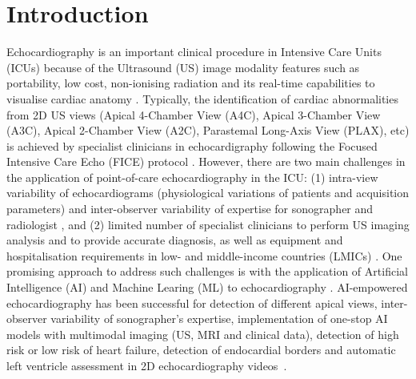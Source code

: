 \documentclass[mlabstract,twocolumn]{jmlr}
\begin{document}
\section{Introduction}
\label{sec:intro}
Echocardiography is an important clinical procedure in Intensive Care Units (ICUs) because of the Ultrasound (US) image modality features such as portability, low cost, non-ionising radiation and its real-time capabilities to visualise cardiac anatomy \citep{Feigenbaum1996, Vieillard-Baron2008, singh2007, cambell2018}.
Typically, the identification of cardiac abnormalities from 2D US views (Apical 4-Chamber View (A4C), Apical 3-Chamber View (A3C), Apical 2-Chamber View (A2C), Parastemal Long-Axis View (PLAX), etc) is achieved by specialist clinicians in echocardigraphy following the Focused Intensive Care Echo (FICE) protocol \citep{2017_hall_JIntensiveCareSociety}. %
However, there are two main challenges in the application of point-of-care echocardiography in the ICU:
(1) intra-view variability of echocardiograms (physiological variations of patients and acquisition parameters) and inter-observer variability of expertise for sonographer and radiologist \citep{khamis2017, Feigenbaum1996, field2011}, and
(2) limited number of specialist clinicians to perform US imaging analysis and to provide accurate diagnosis, as well as equipment and hospitalisation requirements in low- and middle-income countries (LMICs) \citep{hao2021-wellcome, 2021-huyNhat-vanHao-in-FAIR-MICCAI, 2016_becker_in_TropicalMedicineInternationalHealth}.
One promising approach to address such challenges is with the application of Artificial Intelligence (AI) and Machine Learing (ML) to echocardiography \citep{2022ASCH_JAmericanSocietyEchocardiography}.
AI-empowered echocardiography has been successful for detection of different apical views, inter-observer variability of sonographer's expertise, implementation of one-stop AI models with multimodal imaging (US, MRI and clinical data), detection of high risk or low risk of heart failure, detection of endocardial borders and automatic left ventricle assessment in 2D echocardiography videos~\citep{tromp2022, zhang2022-mdpi, behnami2020, ono2022}.
\end{document}
